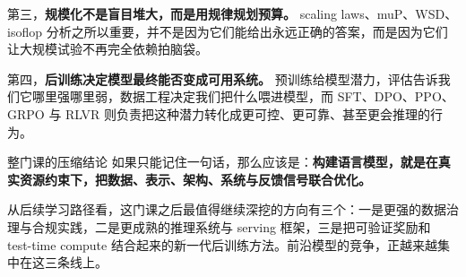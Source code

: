 \documentclass[a4paper]{article}
\begin{document}
第三，\textbf{规模化不是盲目堆大，而是用规律规划预算。} scaling laws、muP、WSD、isoflop 分析之所以重要，并不是因为它们能给出永远正确的答案，而是因为它们让大规模试验不再完全依赖拍脑袋。

第四，\textbf{后训练决定模型最终能否变成可用系统。} 预训练给模型潜力，评估告诉我们它哪里强哪里弱，数据工程决定我们把什么喂进模型，而 SFT、DPO、PPO、GRPO 与 RLVR 则负责把这种潜力转化成更可控、更可靠、甚至更会推理的行为。

\begin{importantbox}{整门课的压缩结论}
如果只能记住一句话，那么应该是：\textbf{构建语言模型，就是在真实资源约束下，把数据、表示、架构、系统与反馈信号联合优化。}
\end{importantbox}

从后续学习路径看，这门课之后最值得继续深挖的方向有三个：一是更强的数据治理与合规实践，二是更成熟的推理系统与 serving 框架，三是把可验证奖励和 test-time compute 结合起来的新一代后训练方法。前沿模型的竞争，正越来越集中在这三条线上。
\end{document}
